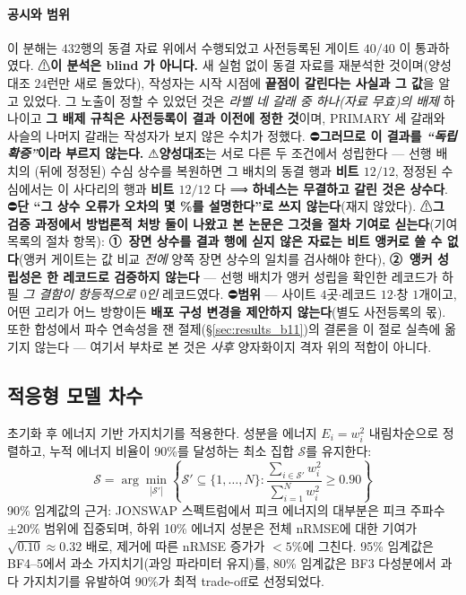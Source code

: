 \documentclass[11pt]{report}
\numberwithin{equation}{chapter}
\numberwithin{figure}{chapter}
\numberwithin{table}{chapter}
\begin{document}
\paragraph{공시와 범위}
이 분해는 $432$행의 동결 자료 위에서 수행되었고 사전등록된 게이트 \textbf{$40/40$} 이
통과하였다.
⚠\textbf{이 분석은 blind 가 아니다.} 새 실험 없이 동결 자료를 재분석한 것이며(양성대조
$24$런만 새로 돌았다), 작성자는 시작 시점에 \textbf{끝점이 갈린다는 사실과 그 값}을
알고 있었다. 그 노출이 정할 수 있었던 것은 \emph{라벨 네 갈래 중 하나(자료 무효)의 배제}
하나이고 \textbf{그 배제 규칙은 사전등록이 결과 이전에 정한 것}이며, PRIMARY 세 갈래와
사슬의 나머지 갈래는 작성자가 보지 않은 수치가 정했다. ⛔\textbf{그러므로 이 결과를
\emph{``독립 확증''}이라 부르지 않는다.}
⚠\textbf{양성대조}는 서로 다른 두 조건에서 성립한다 --- 선행 배치의 (뒤에 정정된) 수심
상수를 복원하면 그 배치의 동결 행과 \textbf{비트 $12/12$}, 정정된 수심에서는 이 사다리의
행과 \textbf{비트 $12/12$} 다 ⟹ \textbf{하네스는 무결하고 갈린 것은 상수다}.
⛔\textbf{단 ``그 상수 오류가 오차의 몇 \%를 설명한다''로 쓰지 않는다}(재지 않았다).
⚠\textbf{그 검증 과정에서 방법론적 처방 둘이 나왔고 본 논문은 그것을 절차 기여로
싣는다}(기여 목록의 절차 항목): \textbf{①~장면 상수를 결과 행에 싣지 않은 자료는 비트
앵커로 쓸 수 없다}(앵커 게이트는 값 비교 \emph{전에} 양쪽 장면 상수의 일치를 검사해야
한다), \textbf{②~앵커 성립성은 한 레코드로 검증하지 않는다} --- 선행 배치가 앵커
성립을 확인한 레코드가 하필 \emph{그 결함이 항등적으로 $0$인} 레코드였다.
⛔\textbf{범위} --- 사이트 $4$곳$\cdot$레코드 $12$$\cdot$창 $1$개이고, 어떤 고리가 어느
방향이든 \textbf{배포 구성 변경을 제안하지 않는다}(별도 사전등록의 몫). 또한 합성에서
파수 연속성을 잰 절제(\S\ref{sec:results_b11})의 결론을 이 절로 실측에 옮기지 않는다
--- 여기서 부차로 본 것은 \emph{사후} 양자화이지 격자 위의 적합이 아니다.

\subsection{적응형 모델 차수}
\label{sec:adaptive}

초기화 후 에너지 기반 가지치기를 적용한다.
성분을 에너지 $E_i = w_i^2$ 내림차순으로 정렬하고,
누적 에너지 비율이 90\%를 달성하는 최소 집합 $\mathcal{S}$를 유지한다:
\begin{equation}
  \mathcal{S} = \arg\min_{|\mathcal{S}'|} \left\{
    \mathcal{S}' \subseteq \{1,\ldots,N\} :
    \frac{\sum_{i \in \mathcal{S}'} w_i^2}{\sum_{i=1}^{N} w_i^2} \geq 0.90
  \right\}
  \label{eq:pruning}
\end{equation}
90\% 임계값의 근거: JONSWAP 스펙트럼에서 피크 에너지의 대부분은 피크 주파수
$\pm 20\%$ 범위에 집중되며, 하위 10\% 에너지 성분은 전체 nRMSE에 대한
기여가 $\sqrt{0.10} \approx 0.32$ 배로, 제거에 따른 nRMSE 증가가
$< 5\%$에 그친다.
95\% 임계값은 BF4--5에서 과소 가지치기(과잉 파라미터 유지)를,
80\% 임계값은 BF3 다성분에서 과다 가지치기를 유발하여
90\%가 최적 trade-off로 선정되었다.
\end{document}
